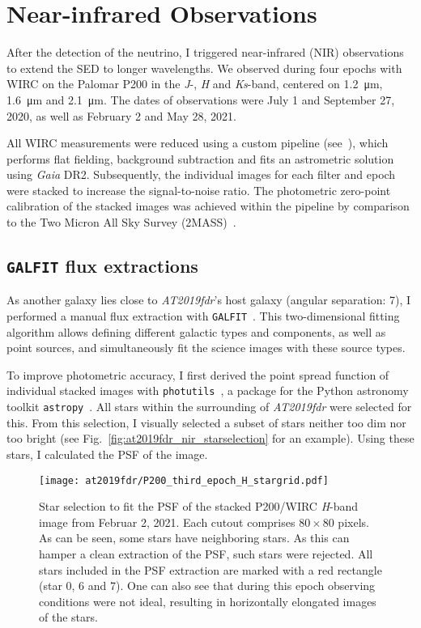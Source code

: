 \section{Near-infrared Observations}\label{nir_reductions}
After the detection of the neutrino, I triggered near-infrared (NIR) observations to extend the SED to longer wavelengths. We observed during four epochs with WIRC on the Palomar P200 in the \textit{J}-, \textit{H} and \textit{Ks}-band, centered on \SI{1.2}{\micro\m}, \SI{1.6}{\micro\m} and \SI{2.1}{\micro\m}. The dates of observations were July 1 and September 27, 2020, as well as February 2 and May 28, 2021.

All WIRC measurements were reduced using a custom pipeline (see~), which performs flat fielding, background subtraction and fits an astrometric solution using \textit{Gaia} DR2. Subsequently, the individual images for each filter and epoch were stacked to increase the signal-to-noise ratio. The photometric zero-point calibration of the stacked images was achieved within the pipeline by comparison to the Two Micron All Sky Survey (2MASS)~.

\subsection{\texttt{GALFIT} flux extractions}

As another galaxy lies close to \emph{AT2019fdr}'s host galaxy (angular separation: \SI{7}{\arcsec}), I performed a manual flux extraction with \texttt{GALFIT}~. This two-dimensional fitting algorithm allows defining different galactic types and components, as well as point sources, and simultaneously fit the science images with these source types.

To improve photometric accuracy, I first derived the point spread function of individual stacked images with \texttt{photutils}~, a package for the Python astronomy toolkit \texttt{astropy}~. All stars within the surrounding of \emph{AT2019fdr} were selected for this. From this selection, I visually selected a subset of stars neither too dim nor too bright (see Fig.~\ref{fig:at2019fdr_nir_starselection} for an example). Using these stars, I calculated the PSF of the image.

\begin{figure*}[htb]
    \texttt{[image: at2019fdr/P200\_third\_epoch\_H\_stargrid.pdf]}
    \caption[P200 \textit{H}-band star selection]{Star selection to fit the PSF of the stacked P200/WIRC \textit{H}-band image from Februar 2, 2021. Each cutout comprises $80\times80$ pixels. As can be seen, some stars have neighboring stars. As this can hamper a clean extraction of the PSF, such stars were rejected. All stars included in the PSF extraction are marked with a red rectangle (star 0, 6 and 7). One can also see that during this epoch observing conditions were not ideal, resulting in horizontally elongated images of the stars.}
\end{figure*}

